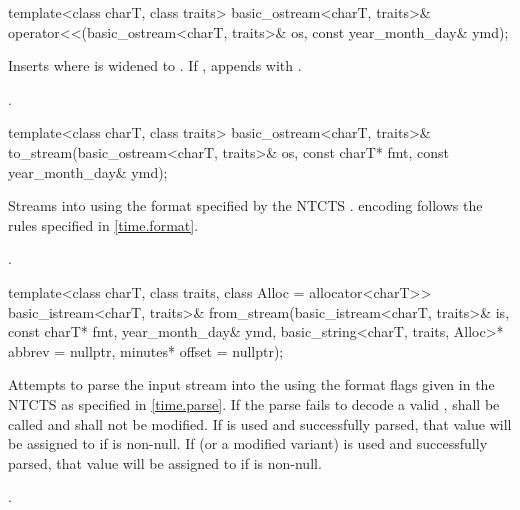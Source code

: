 %
\begin{itemdecl}
template<class charT, class traits>
  basic_ostream<charT, traits>&
    operator<<(basic_ostream<charT, traits>& os, const year_month_day& ymd);
\end{itemdecl}

\begin{itemdescr}
\pnum
\effects
Inserts 
where  is  widened to .
If , appends with .

\pnum
\returns {}.
\end{itemdescr}

%
\begin{itemdecl}
template<class charT, class traits>
  basic_ostream<charT, traits>&
    to_stream(basic_ostream<charT, traits>& os, const charT* fmt, const year_month_day& ymd);
\end{itemdecl}

\begin{itemdescr}
\pnum
\effects
Streams  into  using
the format specified by the NTCTS .
 encoding follows the rules specified in \ref{time.format}.

\pnum
\returns {}.
\end{itemdescr}

%
\begin{itemdecl}
template<class charT, class traits, class Alloc = allocator<charT>>
  basic_istream<charT, traits>&
    from_stream(basic_istream<charT, traits>& is, const charT* fmt,
                year_month_day& ymd, basic_string<charT, traits, Alloc>* abbrev = nullptr,
                minutes* offset = nullptr);
\end{itemdecl}

\begin{itemdescr}
\pnum
\effects
Attempts to parse the input stream 
into the   using
the format flags given in the NTCTS 
as specified in \ref{time.parse}.
If the parse fails to decode a valid ,
 shall be called
and  shall not be modified.
If  is used and successfully parsed,
that value will be assigned to  if  is non-null.
If  (or a modified variant) is used and successfully parsed,
that value will be assigned to  if  is non-null.

\pnum
\returns {}.
\end{itemdescr}


